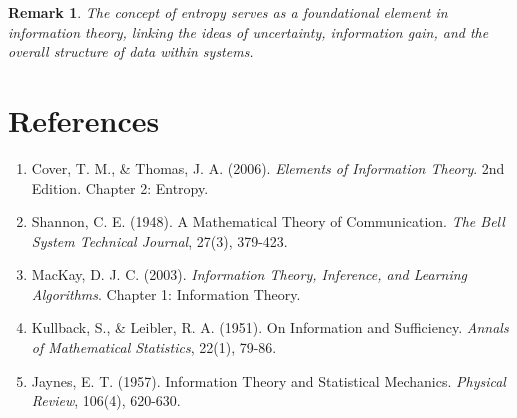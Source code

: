 \documentclass[12pt,a4paper]{article}
\newtheorem{remark}{Remark}[section]
\begin{document}
\begin{remark}
The concept of entropy serves as a foundational element in information theory, linking the ideas of uncertainty, information gain, and the overall structure of data within systems.
\end{remark}

\section{References}
\begin{enumerate}
    \item Cover, T. M., & Thomas, J. A. (2006). \textit{Elements of Information Theory}. 2nd Edition. Chapter 2: Entropy.
    \item Shannon, C. E. (1948). A Mathematical Theory of Communication. \textit{The Bell System Technical Journal}, 27(3), 379-423.
    \item MacKay, D. J. C. (2003). \textit{Information Theory, Inference, and Learning Algorithms}. Chapter 1: Information Theory.
    \item Kullback, S., & Leibler, R. A. (1951). On Information and Sufficiency. \textit{Annals of Mathematical Statistics}, 22(1), 79-86.
    \item Jaynes, E. T. (1957). Information Theory and Statistical Mechanics. \textit{Physical Review}, 106(4), 620-630.
\end{enumerate}
\end{document}
